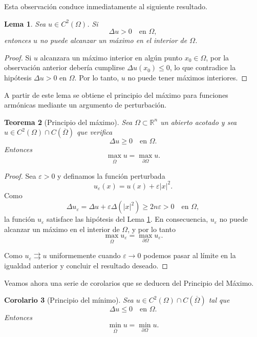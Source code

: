 \documentclass[12pt, a4paper]{amsbook}
\newcommand{\ve}{\varepsilon}
\newcommand{\R}{{\mathbb R}}
\newtheorem{teo}{Teorema}[section]
\newtheorem{lema}[teo]{Lema}
\newtheorem{cor}[teo]{Corolario}
\theoremstyle{remark}
\theoremstyle{definition}
\numberwithin{section}{chapter}
\numberwithin{subsection}{section}
\numberwithin{equation}{section}
\numberwithin{figure}{chapter}
\begin{document}
Esta observación conduce inmediatamente al siguiente resultado.

\medskip

\begin{lema}\label{lem:maximo}
Sea $u\in C^2(\Omega)$. Si
\[
\Delta u > 0 \quad \text{en } \Omega,
\]
entonces $u$ no puede alcanzar un máximo en el interior de $\Omega$.
\end{lema}

\begin{proof}
Si $u$ alcanzara un máximo interior en algún punto $x_0\in\Omega$, por la observación anterior debería cumplirse $\Delta u(x_0)\le 0$, lo que contradice la hipótesis $\Delta u>0$ en $\Omega$. Por lo tanto, $u$ no puede tener máximos interiores.
\end{proof}

A partir de este lema se obtiene el principio del máximo para funciones armónicas mediante un argumento de perturbación.

\medskip

\begin{teo}[Principio del máximo]\label{thm:maximo}
Sea $\Omega\subset\R^n$ un abierto acotado y sea $u\in C^2(\Omega)\cap C(\overline{\Omega})$ que verifica
\[
\Delta u \ge 0 \quad \text{en } \Omega.
\]
Entonces
\[
\max_{\overline{\Omega}} u = \max_{\partial\Omega} u.
\]
\end{teo}

\begin{proof}
Sea $\varepsilon>0$ y definamos la función perturbada
\[
u_\varepsilon(x)=u(x)+\varepsilon |x|^2.
\]
Como
\[
\Delta u_\varepsilon = \Delta u + \varepsilon \Delta(|x|^2)\ge 2n\varepsilon >0
\quad \text{en } \Omega,
\]
la función $u_\varepsilon$ satisface las hipótesis del Lema \ref{lem:maximo}. En consecuencia, $u_\varepsilon$ no puede alcanzar un máximo en el interior de $\Omega$, y por lo tanto
\[
\max_{\overline{\Omega}} u_\varepsilon = \max_{\partial\Omega} u_\varepsilon.
\]

Como $u_\ve\rightrightarrows u$ uniformemente cuando $\ve\to 0$ podemos pasar al límite en la igualdad anterior y concluir el resultado deseado.
\end{proof}

Veamos ahora una serie de corolarios que se deducen del Principio del Máximo.

\begin{cor}[Principio del mínimo]\label{cor:minimo}
Sea $u \in C^2(\Omega) \cap C(\overline{\Omega})$ tal que
\[
\Delta u \le 0 \quad \text{en } \Omega.
\]
Entonces
\[
\min_{\overline{\Omega}} u = \min_{\partial \Omega} u.
\]
\end{cor}
\end{document}
